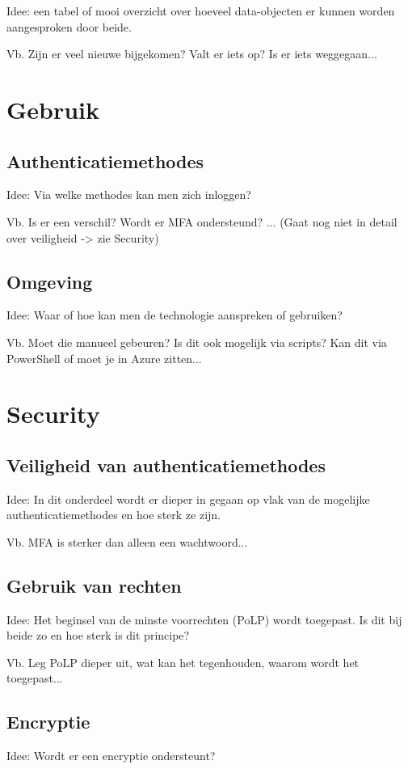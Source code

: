 Idee: een tabel of mooi overzicht over hoeveel data-objecten er kunnen worden aangesproken door beide.

Vb. Zijn er veel nieuwe bijgekomen? Valt er iets op? Is er iets weggegaan...



\section{Gebruik}

\subsection{Authenticatiemethodes}

Idee: Via welke methodes kan men zich inloggen? 

Vb. Is er een verschil? Wordt er MFA ondersteund? ... (Gaat nog niet in detail over veiligheid -> zie Security)

\subsection{Omgeving}

Idee: Waar of hoe kan men de technologie aanspreken of gebruiken?

Vb. Moet die manueel gebeuren? Is dit ook mogelijk via scripts? Kan dit via PowerShell of moet je in Azure zitten...


\section{Security}

\subsection{Veiligheid van authenticatiemethodes}

Idee: In dit onderdeel wordt er dieper in gegaan op vlak van de mogelijke authenticatiemethodes en hoe sterk ze zijn.

Vb. MFA is sterker dan alleen een wachtwoord...

\subsection{Gebruik van rechten}

Idee: Het beginsel van de minste voorrechten (PoLP) wordt toegepast. Is dit bij beide zo en hoe sterk is dit principe?

Vb. Leg PoLP dieper uit, wat kan het tegenhouden, waarom wordt het toegepast...

\subsection{Encryptie}

Idee: Wordt er een encryptie ondersteunt?
